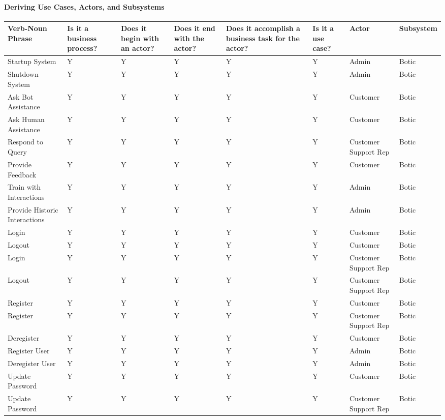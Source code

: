 \documentclass[11pt]{article}
\begin{document}
\paragraph{Deriving Use Cases, Actors, and Subsystems}
\begin{center}
	\hspace*{-0.9cm}\begin{tabular}{|p{2cm}|p{2cm}|p{2cm}|p{2cm}|p{2cm}|p{2cm}|p{2cm}|p{2cm}|}
		\hline
		Verb-Noun Phrase & Is it a business process? & Does it begin with an actor? & Does it end with the actor? & Does it accomplish a business task for the actor? & Is it a use case? & Actor & Subsystem \\
		\hline
		Startup System & Y & Y & Y & Y & Y & Admin & Botic \\
		\hline
		Shutdown System & Y & Y & Y & Y & Y & Admin & Botic \\
		\hline
		Ask Bot Assistance & Y & Y & Y & Y & Y & Customer & Botic \\ %
		\hline
		Ask Human Assistance & Y & Y & Y & Y & Y & Customer & Botic \\
		\hline
		Respond to Query & Y & Y & Y & Y & Y & Customer Support Rep & Botic \\
		\hline
		Provide Feedback & Y & Y & Y & Y & Y & Customer & Botic \\
		\hline
		Train with Interactions & Y & Y & Y & Y & Y & Admin & Botic \\ %
		\hline
		Provide Historic Interactions & Y & Y & Y & Y & Y & Admin & Botic \\
		\hline
		Login & Y & Y & Y & Y & Y & Customer & Botic \\
		\hline
		Logout & Y & Y & Y & Y & Y & Customer & Botic \\
		\hline
		Login & Y & Y & Y & Y & Y & Customer Support Rep & Botic \\
		\hline
		Logout & Y & Y & Y & Y & Y & Customer Support Rep & Botic \\
		\hline
		Register & Y & Y & Y & Y & Y & Customer & Botic \\
		\hline
		Register & Y & Y & Y & Y & Y & Customer Support Rep & Botic \\
		\hline
		Deregister & Y & Y & Y & Y & Y & Customer & Botic \\
		\hline
		Register User & Y & Y & Y & Y & Y & Admin & Botic \\
		\hline
		Deregister User & Y & Y & Y & Y & Y & Admin & Botic \\
		\hline
		Update Password & Y & Y & Y & Y & Y & Customer & Botic \\
		\hline
		Update Password & Y & Y & Y & Y & Y & Customer Support Rep & Botic \\
		\hline		
	\end{tabular}
\end{center}
\end{document}
